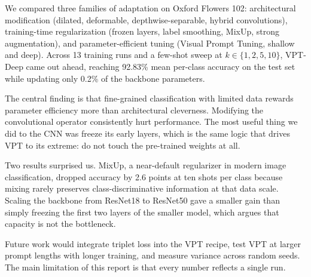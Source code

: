 We compared three families of adaptation on Oxford Flowers 102: architectural modification (dilated, deformable, depthwise-separable, hybrid convolutions), training-time regularization (frozen layers, label smoothing, MixUp, strong augmentation), and parameter-efficient tuning (Visual Prompt Tuning, shallow and deep). Across 13 training runs and a few-shot sweep at $k \in \{1, 2, 5, 10\}$, VPT-Deep came out ahead, reaching 92.83\% mean per-class accuracy on the test set while updating only 0.2\% of the backbone parameters.

The central finding is that fine-grained classification with limited data rewards parameter efficiency more than architectural cleverness. Modifying the convolutional operator consistently hurt performance. The most useful thing we did to the CNN was freeze its early layers, which is the same logic that drives VPT to its extreme: do not touch the pre-trained weights at all.

Two results surprised us. MixUp, a near-default regularizer in modern image classification, dropped accuracy by 2.6 points at ten shots per class because mixing rarely preserves class-discriminative information at that data scale. Scaling the backbone from ResNet18 to ResNet50 gave a smaller gain than simply freezing the first two layers of the smaller model, which argues that capacity is not the bottleneck.

Future work would integrate triplet loss into the VPT recipe, test VPT at larger prompt lengths with longer training, and measure variance across random seeds. The main limitation of this report is that every number reflects a single run.
